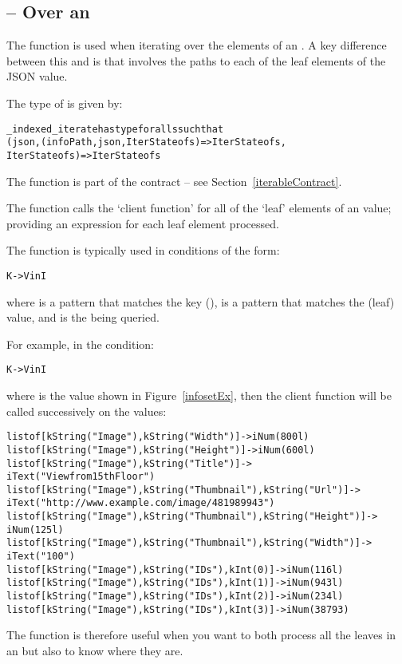 \subsection{ -- Over an }

The  function is used when iterating over the elements of an . A key difference between this and  is that  involves the paths to each of the leaf elements of the JSON value.

The type of  is given by:
\begin{alltt}
\_indexed\_iterate has type for all s such that
  (json,(infoPath,json,IterState of s)=>IterState of s,
   IterState of s) => IterState of s
\end{alltt}
The  function is part of the  contract -- see Section~\vref{iterableContract}.

The  function calls the `client function' for all of the `leaf' elements of an  value; providing an  expression for each leaf element processed.

The  function is typically used in conditions of the form:
\begin{alltt}
K -> V in I
\end{alltt}
where  is a pattern that matches the key (),  is a pattern that matches the (leaf) value, and  is the  being queried.

For example, in the condition:
\begin{alltt}
K->V in I
\end{alltt}
where  is the  value shown in Figure~\vref{infosetEx}, then the client function will be called successively on the  values:
\begin{alltt}
list of [kString("Image"), kString("Width")] -> iNum(800l)
list of [kString("Image"), kString("Height")] -> iNum(600l)
list of [kString("Image"), kString("Title")] ->
       iText("View from 15th Floor")
list of [kString("Image"), kString("Thumbnail"), kString("Url")] -> 
       iText("http://www.example.com/image/481989943")
list of [kString("Image"), kString("Thumbnail"), kString("Height")] -> 
       iNum(125l)
list of [kString("Image"), kString("Thumbnail"), kString("Width")] -> 
       iText("100")
list of [kString("Image"), kString("IDs"), kInt(0)] -> iNum(116l)
list of [kString("Image"), kString("IDs"), kInt(1)] -> iNum(943l)
list of [kString("Image"), kString("IDs"), kInt(2)] -> iNum(234l)
list of [kString("Image"), kString("IDs"), kInt(3)] -> iNum(38793)
\end{alltt}
The  function is therefore useful when you want to both process all the leaves in an  but also to know where they are.



